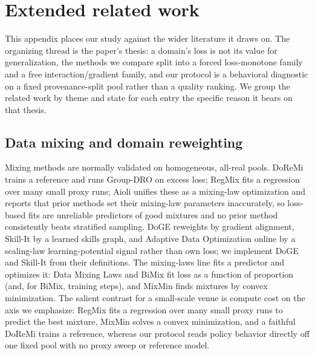 \documentclass{article}
\begin{document}
\section{Extended related work}
\label{app:related}

This appendix places our study against the wider literature it draws on. The organizing thread is the paper's thesis: a domain's loss is not its value for generalization, the methods we compare split into a forced loss-monotone family and a free interaction/gradient family, and our protocol is a behavioral diagnostic on a fixed provenance-split pool rather than a quality ranking. We group the related work by theme and state for each entry the specific reason it bears on that thesis.

\subsection{Data mixing and domain reweighting}

Mixing methods are normally validated on homogeneous, all-real pools. DoReMi \citep{doremi2023} trains a reference and runs Group-DRO \citep{groupdro2020} on excess loss; RegMix \citep{regmix2025} fits a regression over many small proxy runs; Aioli \citep{aioli2024} unifies these as a mixing-law optimization and reports that prior methods set their mixing-law parameters inaccurately, so loss-based fits are unreliable predictors of good mixtures and no prior method consistently beats stratified sampling. DoGE \citep{doge2024} reweights by gradient alignment, Skill-It \citep{skillit2023} by a learned skills graph, and Adaptive Data Optimization \citep{ado2025} online by a scaling-law learning-potential signal rather than own loss; we implement DoGE and Skill-It from their definitions. The mixing-laws line fits a predictor and optimizes it: Data Mixing Laws \citep{datamixinglaws2024} and BiMix \citep{bimix2024} fit loss as a function of proportion (and, for BiMix, training steps), and MixMin \citep{mixmin2025} finds mixtures by convex minimization. The salient contrast for a small-scale venue is compute cost on the axis we emphasize: RegMix fits a regression over many small proxy runs to predict the best mixture, MixMin solves a convex minimization, and a faithful DoReMi trains a reference, whereas our protocol reads policy behavior directly off one fixed pool with no proxy sweep or reference model.
\end{document}
